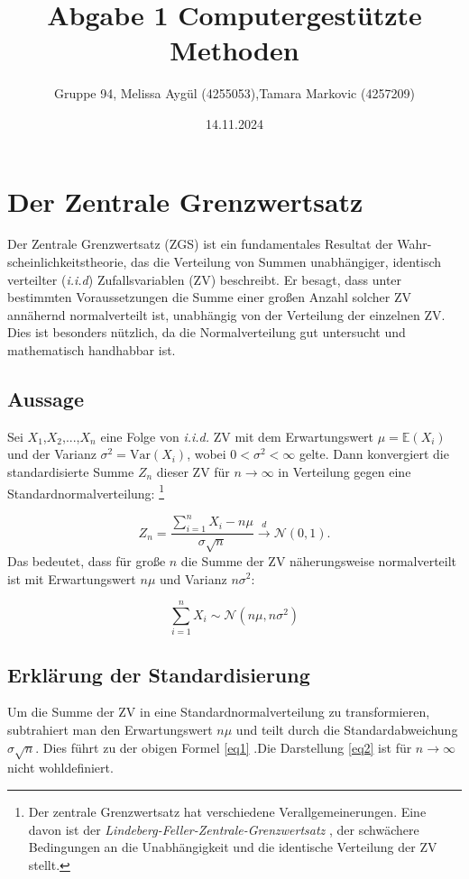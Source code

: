 \documentclass{article}
\title{Abgabe 1 Computergestützte Methoden}
\author{Gruppe 94, Melissa Aygül (4255053),Tamara Markovic (4257209)}
\date{14.11.2024}
\begin{document}
\maketitle
\tableofcontents

\newpage

\section{Der Zentrale Grenzwertsatz}
Der Zentrale Grenzwertsatz (ZGS) ist ein fundamentales Resultat der Wahr-
scheinlichkeitstheorie, das die Verteilung von Summen unabhängiger, identisch verteilter (\textit{i.i.d}) Zufallsvariablen (ZV) beschreibt. Er besagt, dass unter bestimmten Voraussetzungen die Summe einer großen Anzahl solcher ZV annähernd normalverteilt ist, unabhängig von der Verteilung der einzelnen ZV. Dies ist besonders nützlich, da die Normalverteilung gut untersucht und mathematisch handhabbar ist.

\subsection{Aussage}
Sei $X_1$,$X_2$,...,$X_n$ eine Folge von \textit{i.i.d.} ZV mit dem Erwartungswert $\mu = \mathbb{E}(X_i)$ und der Varianz $\sigma^2 = \text{Var}(X_i)$, wobei $0 < \sigma^2 < \infty$ gelte. Dann konvergiert
die standardisierte Summe $Z_n$ dieser ZV für $n \to \infty$
in Verteilung gegen eine Standardnormalverteilung:
\footnote{Der zentrale Grenzwertsatz hat verschiedene Verallgemeinerungen. Eine davon ist der 
\textit{Lindeberg-Feller-Zentrale-Grenzwertsatz} \cite[Seite 328]{Klenke}, der schwächere Bedingungen an die Unabhängigkeit 
und die identische Verteilung der ZV stellt.}

\begin{equation}
Z_n = \frac{\sum_{i=1}^n X_i - n\mu}{\sigma\sqrt{n}} \overset{d}{\to} \mathcal{N}(0, 1).
\label{eq1}
\end{equation}
Das bedeutet, dass für große $n$ die Summe der ZV näherungsweise normalverteilt ist 
mit Erwartungswert $n\mu$ und Varianz $n\sigma^2$:

\begin{equation}
\sum_{i=1}^n X_i \sim \mathcal{N}(n\mu, n\sigma^2)
\label{eq2}
\end{equation}

\subsection{Erklärung der Standardisierung}
Um die Summe der ZV in eine Standardnormalverteilung zu transformieren, subtrahiert man den Erwartungswert $n\mu$ und teilt durch die Standardabweichung $\sigma\sqrt{n}$. Dies führt zu der obigen Formel \eqref{eq1} .Die Darstellung \eqref{eq2} ist für
$n \to \infty$ nicht wohldefiniert.
\end{document}
